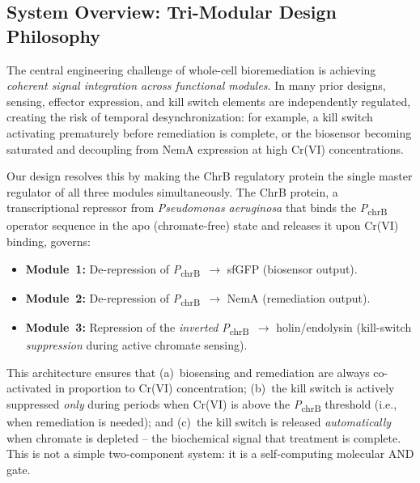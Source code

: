 \documentclass[10pt,twocolumn,letterpaper,
              colorlinks=true,
              linkcolor=blue!70!black,
              citecolor=blue!70!black,
              urlcolor=blue!70!black,
              pdfborder={0 0 0}]{article}
\begin{document}
\subsection{System Overview: Tri-Modular Design Philosophy}

The central engineering challenge of whole-cell bioremediation is
achieving \textit{coherent signal integration across functional modules}.
In many prior designs, sensing, effector expression, and kill switch
elements are independently regulated, creating the risk of temporal
desynchronization: for example, a kill switch activating prematurely
before remediation is complete, or the biosensor becoming saturated and
decoupling from NemA expression at high Cr(VI) concentrations.

Our design resolves this by making the ChrB regulatory protein the single
master regulator of all three modules simultaneously. The ChrB protein, a
transcriptional repressor from \textit{Pseudomonas aeruginosa} that binds
the \textit{P}\textsubscript{chrB} operator sequence in the apo
(chromate-free) state and releases it upon Cr(VI) binding, governs:

\begin{itemize}
  \item \textbf{Module~1:} De-repression of
        \textit{P}\textsubscript{chrB}~$\rightarrow$ sfGFP
        (biosensor output).
  \item \textbf{Module~2:} De-repression of
        \textit{P}\textsubscript{chrB}~$\rightarrow$ NemA
        (remediation output).
  \item \textbf{Module~3:} Repression of the \textit{inverted}
        \textit{P}\textsubscript{chrB}~$\rightarrow$
        holin/endolysin (kill-switch \textit{suppression} during
        active chromate sensing).
\end{itemize}

This architecture ensures that (a)~biosensing and remediation are always
co-activated in proportion to Cr(VI) concentration; (b)~the kill switch
is actively suppressed \textit{only} during periods when Cr(VI) is above
the \textit{P}\textsubscript{chrB} threshold (i.e., when remediation is
needed); and (c)~the kill switch is released \textit{automatically} when
chromate is depleted -- the biochemical signal that treatment is complete.
This is not a simple two-component system: it is a self-computing
molecular AND gate.
\end{document}

